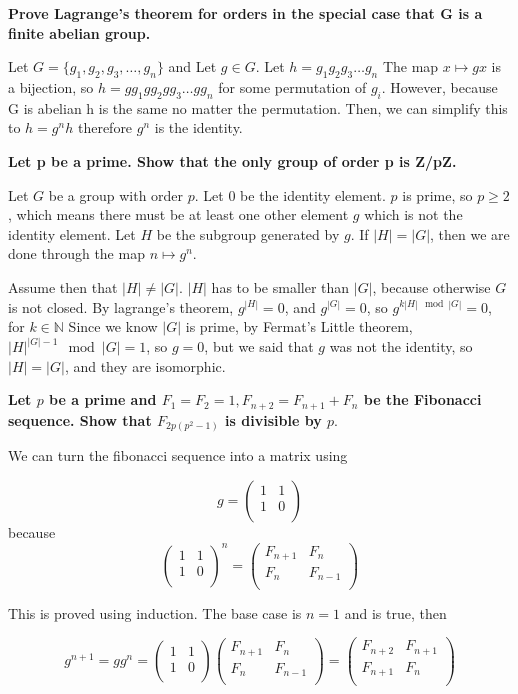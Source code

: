 \documentclass{article}
\begin{document}
\textbf{Prove Lagrange’s theorem for orders in the special case that G is a finite
abelian group.}


Let $G = \{g_1, g_2, g_3, \dots, g_n\}$ and 
Let $g \in G$. Let $h = g_1g_2g_3\dots g_n $  The map $x \mapsto gx $ is a bijection,
so $h = g g_1 g g_2 g g_3 \dots g g_n$ for some permutation of $g_i$.  However,  because G is abelian
h is the same no matter the permutation.  Then, we can simplify this to
$h = g^n h$ therefore $g^n$ is the identity.

\textbf{Let p be a prime. Show that the only group of order p is Z/pZ.}


Let $G$ be a group with order $p$. Let $0$ be the identity element. $p$ is prime, so $p \ge 2$, which means there must
be at least one other element $g$ which is not the identity element. Let $H$ be the subgroup
generated by $g$. If $|H| = |G|$, then we are done through the map $n \mapsto g^n$. 

Assume then that $|H| \ne |G|$. $|H|$ has to be smaller than $|G|$, because otherwise $G$ is not closed.  
By lagrange's theorem,  $g^{|H|} = 0$, and $g^{|G|} = 0$, so $g ^{k |H| \mod |G|} = 0$, for $k \in \mathbb{N}$
Since we know $|G|$ is prime, by Fermat's Little theorem, $|H|^{|G| - 1} \mod |G| = 1$,
so $g = 0$, but we said that $g$ was not the identity, so $|H| = |G|$, and they 
are isomorphic.


\textbf{Let $p$ be a prime and $F_1 = F_2 = 1, F_{n+2} = F_{n+1} + F_n$
 be the Fibonacci sequence. Show that $F_{2p(p^2-1)}$ is divisible by $p$}.


We can turn the fibonacci sequence into a matrix using


\[
g = 
\begin{pmatrix}
1 & 1 \\
1 & 0 \\
\end{pmatrix} 
\]
because 
\[
\begin{pmatrix}
1 & 1 \\
1 & 0 \\
\end{pmatrix}^n = 
\begin{pmatrix}
F_{n+1} & F_{n} \\
F_n & F_{n -1 }\\
\end{pmatrix}
\]

This is proved using induction.  The base case is $n = 1$ and is true, then 

\[
g^{n + 1} = g g^n = \begin{pmatrix}
1 & 1 \\
1 & 0 \\
\end{pmatrix}
\begin{pmatrix}
F_{n + 1} & F_{n} \\
F_n & F_{n - 1} \\
\end{pmatrix} = 
\begin{pmatrix}
F_{n + 2}  & F_{n + 1} \\
F_{n + 1} & F_n \\
\end{pmatrix}
\]
\end{document}
